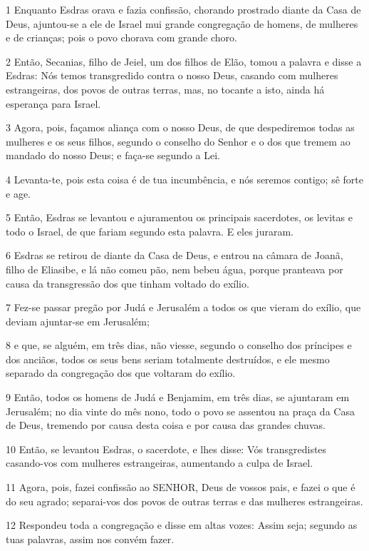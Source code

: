 \par 1 Enquanto Esdras orava e fazia confissão, chorando prostrado diante da Casa de Deus, ajuntou-se a ele de Israel mui grande congregação de homens, de mulheres e de crianças; pois o povo chorava com grande choro.
\par 2 Então, Secanias, filho de Jeiel, um dos filhos de Elão, tomou a palavra e disse a Esdras: Nós temos transgredido contra o nosso Deus, casando com mulheres estrangeiras, dos povos de outras terras, mas, no tocante a isto, ainda há esperança para Israel.
\par 3 Agora, pois, façamos aliança com o nosso Deus, de que despediremos todas as mulheres e os seus filhos, segundo o conselho do Senhor e o dos que tremem ao mandado do nosso Deus; e faça-se segundo a Lei.
\par 4 Levanta-te, pois esta coisa é de tua incumbência, e nós seremos contigo; sê forte e age.
\par 5 Então, Esdras se levantou e ajuramentou os principais sacerdotes, os levitas e todo o Israel, de que fariam segundo esta palavra. E eles juraram.
\par 6 Esdras se retirou de diante da Casa de Deus, e entrou na câmara de Joanã, filho de Eliasibe, e lá não comeu pão, nem bebeu água, porque pranteava por causa da transgressão dos que tinham voltado do exílio.
\par 7 Fez-se passar pregão por Judá e Jerusalém a todos os que vieram do exílio, que deviam ajuntar-se em Jerusalém;
\par 8 e que, se alguém, em três dias, não viesse, segundo o conselho dos príncipes e dos anciãos, todos os seus bens seriam totalmente destruídos, e ele mesmo separado da congregação dos que voltaram do exílio.
\par 9 Então, todos os homens de Judá e Benjamim, em três dias, se ajuntaram em Jerusalém; no dia vinte do mês nono, todo o povo se assentou na praça da Casa de Deus, tremendo por causa desta coisa e por causa das grandes chuvas.
\par 10 Então, se levantou Esdras, o sacerdote, e lhes disse: Vós transgredistes casando-vos com mulheres estrangeiras, aumentando a culpa de Israel.
\par 11 Agora, pois, fazei confissão ao SENHOR, Deus de vossos pais, e fazei o que é do seu agrado; separai-vos dos povos de outras terras e das mulheres estrangeiras.
\par 12 Respondeu toda a congregação e disse em altas vozes: Assim seja; segundo as tuas palavras, assim nos convém fazer.
